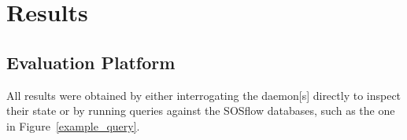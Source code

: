 
\section{Results} %
\subsection{Evaluation Platform} %
All results were obtained by either interrogating the daemon[s] directly
to inspect their state or by running queries against the SOSflow
databases, such as the one in Figure~\ref{example_query}.
%
%
%
%


